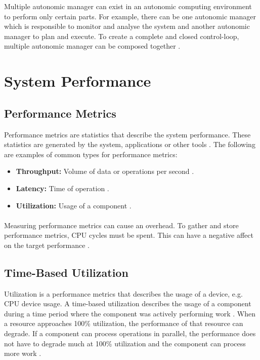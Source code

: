 Multiple autonomic manager can exist in an autonomic computing environment to perform only certain parts. For example, there can be one autonomic manager which is responsible to monitor and analyse the system and another autonomic manager to plan and execute. To create a complete and closed control-loop, multiple autonomic manager can be composed together \cite{Sinreich2006AnAB}.


\section{System Performance}


\subsection{Performance Metrics}
Performance metrics are statistics that describe the system performance. These statistics are generated by the system, applications or other tools \cite{Greg2020SysPerf}.
The following are examples of common types for performance metrics:
\begin{itemize}
\item \textbf{Throughput:} Volume of data or operations per second \cite{Greg2020SysPerf}.
\item \textbf{Latency:} Time of operation \cite{Greg2020SysPerf}.
\item \textbf{Utilization:} Usage of a component \cite{Greg2020SysPerf}.
\end{itemize}


\paragraph{}Measuring performance metrics can cause an overhead. To gather and store performance metrics, CPU cycles must be spent. This can have a negative affect on the target performance \cite{Greg2020SysPerf}.


\subsection{Time-Based Utilization}
Utilization is a performance metrics that describes the usage of a device, e.g. CPU device usage.
A time-based utilization describes the usage of a component during a time period where the component was actively performing work \cite{Greg2020SysPerf}.
When a resource approaches 100\% utilization, the performance of that resource can degrade. If a component can process operations in parallel, the performance does not have to degrade much at 100\% utilization and the component can process more work \cite{Greg2020SysPerf}.


